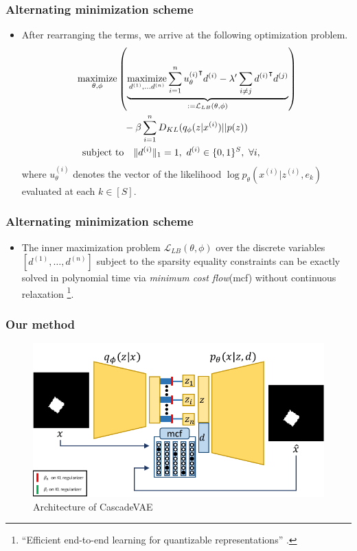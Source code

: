 \documentclass[10pt,mathserif]{beamer}
\begin{document}
\begin{frame}
\frametitle{Alternating minimization scheme}
\begin{itemize}
\item
    After rearranging the terms, we arrive at the following optimization problem.
\begin{align}
&\operatorname*{maximize}_{\theta, \phi} \left(\underbrace{\operatorname*{maximize}_{d^{(1)},\ldots d^{(n)}} \sum_{i=1}^n {u_\theta^{(i)}}^\intercal d^{(i)} - \lambda' \sum_{i\neq j} {d^{(i)}}^\intercal d^{(j)}}_{:= \mathcal{L}_{LB}(\theta, \phi)} \right)\nonumber\\
&\qquad\qquad\quad - \beta \sum_{i=1}^n D_{KL}(q_\phi(z|x^{(i)})||p(z))\nonumber\\
&\text{\ \  subject to }~~ \| d^{(i)} \|_1 = 1,~ d^{(i)} \in \{0,1\}^S,~ \forall i, \nonumber
\end{align}
where $u_\theta^{(i)}$ denotes the vector of the  likelihood $\log p_\theta(x^{(i)}|z^{(i)}, e_k)$ evaluated at each $k \in [S]$.
        
\end{itemize}
\end{frame}

\begin{frame}
\frametitle{Alternating minimization scheme}
\begin{itemize}
    \item The inner maximization problem $\mathcal{L}_{LB}(\theta, \phi)$  over the discrete variables $[d^{(1)},\ldots,d^{(n)}]$ subject to the sparsity equality constraints can be exactly solved in polynomial time via \emph{minimum cost flow}(mcf) without  continuous relaxation \footnote{\scriptsize {\color{blue}{Jeong, Y. and Song, H. O.}} ``Efficient end-to-end learning for quantizable representations'' {\color{gray}{ICML2018}}.}. 
\end{itemize}
\end{frame}

\begin{frame}
\frametitle{Our method}
\begin{figure}
\includegraphics[page=2, width=\linewidth]{dis_asset/arch}
\caption{Architecture of CascadeVAE}
\end{figure}
\end{frame} 
\end{document}
